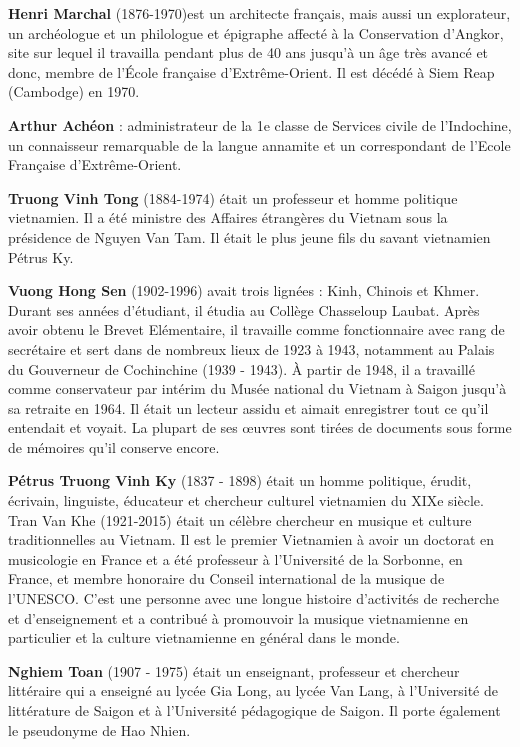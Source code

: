 \textbf{Henri Marchal} (1876-1970)est un architecte français, mais aussi un explorateur, un archéologue et un philologue et épigraphe affecté à la Conservation d'Angkor, site sur lequel il travailla pendant plus de 40 ans jusqu'à un âge très avancé et donc, membre de l'École française d'Extrême-Orient. Il est décédé à Siem Reap (Cambodge) en 1970.

\textbf{Arthur Achéon} : administrateur de la 1e classe de Services civile de l'Indochine, un connaisseur remarquable de la langue annamite et un correspondant de l'Ecole Française d'Extrême-Orient.

\textbf{Truong Vinh Tong} (1884-1974) était un professeur et homme politique vietnamien. Il a été ministre des Affaires étrangères du Vietnam sous la présidence de Nguyen Van Tam. Il était le plus jeune fils du savant vietnamien Pétrus Ky.

\textbf{Vuong Hong Sen} (1902-1996) avait trois lignées : Kinh, Chinois et Khmer. Durant ses années d'étudiant, il étudia au Collège Chasseloup Laubat. Après avoir obtenu le Brevet Elémentaire, il travaille comme fonctionnaire avec rang de secrétaire et sert dans de nombreux lieux de 1923 à 1943, notamment au Palais du Gouverneur de Cochinchine (1939 - 1943). À partir de 1948, il a travaillé comme conservateur par intérim du Musée national du Vietnam à Saigon jusqu'à sa retraite en 1964. Il était un lecteur assidu et aimait enregistrer tout ce qu'il entendait et voyait. La plupart de ses œuvres sont tirées de documents sous forme de mémoires qu'il conserve encore.

\textbf{Pétrus Truong Vinh Ky} (1837 - 1898) était un homme politique, érudit, écrivain, linguiste, éducateur et chercheur culturel vietnamien du XIXe siècle.
Tran Van Khe (1921-2015) était un célèbre chercheur en musique et culture traditionnelles au Vietnam. Il est le premier Vietnamien à avoir un doctorat en musicologie en France et a été professeur à l'Université de la Sorbonne, en France, et membre honoraire du Conseil international de la musique de l'UNESCO. C'est une personne avec une longue histoire d'activités de recherche et d'enseignement et a contribué à promouvoir la musique vietnamienne en particulier et la culture vietnamienne en général dans le monde.

\textbf{Nghiem Toan} (1907 - 1975) était un enseignant, professeur et chercheur littéraire qui a enseigné au lycée Gia Long, au lycée Van Lang, à l'Université de littérature de Saigon et à l'Université pédagogique de Saigon. Il porte également le pseudonyme de Hao Nhien.

